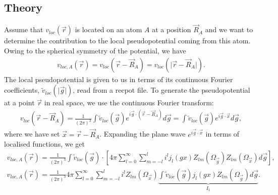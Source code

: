 \documentclass[letterpaper,10pt,english]{sphinxmanual}
\begin{document}
\subsection{Theory}
\label{\detokenize{realspace_local_pseudo:theory}}
Assume that \({v_{loc}\left(\vec{r}\right)}\) is located on an atom
\(A\) at a position \(\vec{R}_A\) and we want to determine the
contribution to the local pseudopotential coming from this atom. Owing
to the spherical symmetry of the potential, we have
\begin{equation*}
\begin{split}{v_{loc,A}\left(\vec{r}\right)}= v_{loc}\left(\vec{r}-\vec{R}_A\right) = v_{loc}\left(\vert\vec{r}-\vec{R}_A\vert\right).\end{split}
\end{equation*}
The local pseudopotential is given to us in terms of its continuous
Fourier coefficients,
\({\tilde{v}_{loc}\left(\vert\vec{g}\vert\right)}\), read from a
recpot file. To generate the pseudopotential at a point \(\vec{r}\)
in real space, we use the continuous Fourier transform:
\begin{equation*}
\begin{split}v_{loc}\left(\vec{r}-\vec{R}_A\right) = \frac{1}{{\left(2\pi\right)}^{3}}\int {\tilde{v}_{loc}\left(\vec{g}\right)}e^{i\vec{g}\cdot \left(\vec{r}-\vec{R}_A\right)}d\vec{g}=\int{\tilde{v}_{loc}\left(\vec{g}\right)}e^{i\vec{g}\cdot \vec{x}}d\vec{g},\end{split}
\end{equation*}
where we have set \(\vec{x}=\vec{r}-\vec{R}_A\). Expanding the
plane wave \(e^{i\vec{g}\cdot\vec{x}}\) in terms of localised
functions, we get
\begin{equation*}
\begin{split}{v_{loc,A}\left(\vec{r}\right)}=
\frac{1}{{\left(2\pi\right)}^{3}}
\int {\tilde{v}_{loc}\left(\vec{g}\right)}\cdot \left[ 4\pi
\sum_{l=0}^{\infty}
\sum_{m=-l}^{l} i^l
j_l\left( gx\right)
Z_{lm}\left(\Omega_{\vec{g}}\right)
Z_{lm}\left(\Omega_{\vec{x}}\right)
d\vec{g}
\right],\end{split}
\end{equation*}\label{\detokenize{realspace_local_pseudo:equation-eq4}}\begin{equation}\label{equation:realspace_local_pseudo:eq4}
\begin{split}{v_{loc,A}\left(\vec{r}\right)}=
\frac{1}{{\left(2\pi\right)}^{3}}
4\pi
\sum_{l=0}^{\infty}
\sum_{m=-l}^{l} i^l
Z_{lm}\left(\Omega_{\vec{x}}\right)
\underbrace{
\int {\tilde{v}_{loc}\left(\vec{g}\right)}j_l\left( gx\right)
Z_{lm}\left(\Omega_{\vec{g}}\right)
d\vec{g}}_{I_1}.\end{split}
\end{equation}
\end{document}
